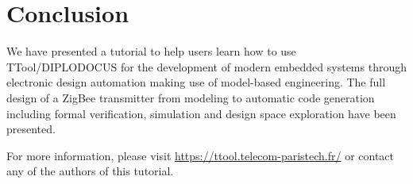 \documentclass{llncs}
\begin{document}
\section{Conclusion}
\label{sec:Conclusion}
We have presented a tutorial to help users learn how to use TTool/DIPLODOCUS for
the development of modern embedded systems through electronic design automation
making use of model-based engineering. The full design of a ZigBee transmitter from modeling to automatic code generation
including formal verification, simulation and design space exploration have been
presented.

For more information, please visit \url{https://ttool.telecom-paristech.fr/} or
contact any of the authors of this tutorial.
%
\end{document}
